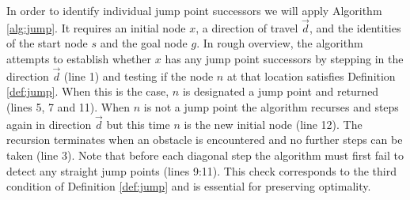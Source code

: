 In order to identify individual jump point successors we will apply Algorithm
\ref{alg:jump}. It requires an initial node $x$, a direction of travel
$\vec{d}$, and the identities of 
the start node $s$ and the goal node $g$.
In rough overview, the algorithm attempts to establish whether $x$ has any 
jump point successors by stepping in the direction $\vec{d}$ (line 1) and testing
if the node $n$ at that location satisfies Definition \ref{def:jump}.
When this is the case, $n$ is designated a jump point and returned (lines 5, 7
and 11).
When $n$ is not a jump point the algorithm recurses and steps again in direction
$\vec{d}$ but this time $n$ is the new initial node (line 12).
The recursion terminates when an obstacle is encountered and no further
steps can be taken (line 3).
Note that before each diagonal step the algorithm must first 
fail to detect any straight jump points (lines 9:11). 
This check corresponds to the third condition of Definition \ref{def:jump} 
and is essential for preserving optimality.
